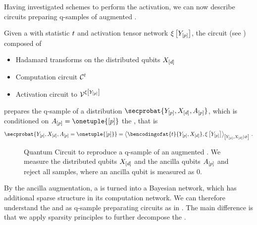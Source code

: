 Having investigated schemes to perform the activation, we can now describe circuits preparing q-samples of augmented \ComputationActivationNetworks{}.

\begin{theorem}
    Given a \CompActNet{} with statistic $t$ and activation tensor network $\xi\left[Y_{[p]}\right]$, the circuit (see ) composed of
    \begin{itemize}
        \item Hadamard transforms on the distributed qubits $X_{[d]}$
        \item Computation circuit $\mathcal{C}^{t}$
        \item Activation circuit to $\mathcal{V}^{\xi\left[Y_{[p]}\right]}$
    \end{itemize}
    prepares the q-sample of a distribution $\secprobat{\headvariables,\shortcatvariables,\avariables}$, which is conditioned on $\avariables=\onetuple{[\seldim]}$ the \CompActNet{}, that is
    \begin{align*}
        \secprobat{\headvariables,\shortcatvariables,\avariables=\onetuple{[\seldim]}}
        = \normalizationof{\bencodingofat{\sstat}{\headvariables,\shortcatvariables},\acttensorat{\headvariables}}{\headvariables,\shortcatvariables} \, .
    \end{align*}
\end{theorem}


\begin{figure}
    \begin{center}
        
    \end{center}
    \caption{
        Quantum Circuit to reproduce a q-sample of an augmented \ComputationActivationNetwork{}.
        We measure the distributed qubits $X_{[d]}$ and the ancilla qubits $A_{[p]}$ and reject all samples, where an ancilla qubit is measured as $0$.
    }\label{fig:caCircuit}
\end{figure}



By the ancilla augmentation, a \CompActNet{} is turned into a Bayesian network, which has additional sparse structure in its computation network.
We can therefore understand the \computationCircuits{} and \activationCircuits{} as q-sample preparating circuits as in \cite{low_quantum_2014}.
The main difference is that we apply sparsity principles to further decompose the \computationCircuits{}.